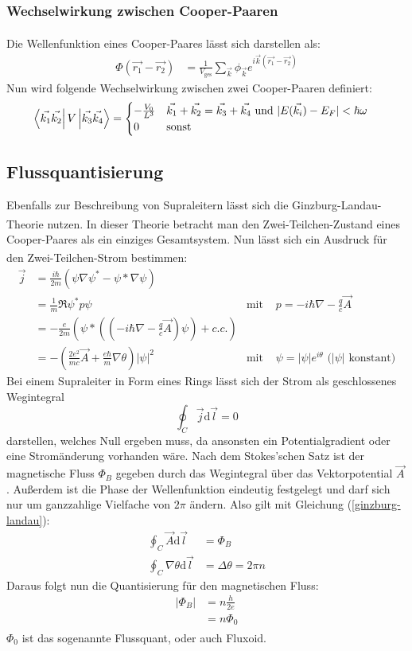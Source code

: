 \documentclass[12pt]{article}
\begin{document}
\subsubsection{Wechselwirkung zwischen Cooper-Paaren}
Die Wellenfunktion eines Cooper-Paares lässt sich darstellen als: \textsuperscript{\cite{anleitung}}
\begin{align}
	\Phi(\vec{r_1}-\vec{r_2})&=\frac1{V_{\mathrm{ges}}}\sum_{\vec k}\phi_{\vec k}e^{i\vec k(\vec{r_1}-\vec{r_2})}
\end{align}
Nun wird folgende Wechselwirkung zwischen zwei Cooper-Paaren definiert:
\begin{align}
	\bra{\vec{k_1}\vec{k_2}}V\ket{\vec{k_3}\vec{k_4}}&=\begin{cases}-\frac{V_0}{L^3}&\vec{k_1}+\vec{k_2}=\vec{k_3}+\vec{k_4} \text{ und }|E(\vec{k_i})-E_F|<\hbar\omega\\0&\text{sonst}\end{cases}
\end{align}

\subsection{Flussquantisierung}
Ebenfalls zur Beschreibung von Supraleitern lässt sich die Ginzburg-Landau-Theorie\textsuperscript{\cite{anleitung}} nutzen. In dieser Theorie betracht man den Zwei-Teilchen-Zustand eines Cooper-Paares als ein einziges Gesamtsystem. Nun lässt sich ein Ausdruck für den Zwei-Teilchen-Strom bestimmen\textsuperscript{\cite{anleitung}}:
\begin{align}
	\vec j&=\frac{i\hbar}{2m}\left(\psi\nabla\psi^* -\psi*\nabla\psi\right)\\
	&=\frac1m\Re{\psi^*p\psi}&\text{mit }&p=-i\hbar\nabla-\frac qc\vec A\\
	&=-\frac{e}{2m}\left(\psi*\left(\left(-i\hbar\nabla-\frac qc\vec A\right)\psi\right)+c.c.\right)\\
	&=-\left(\frac{2e^2}{mc}\vec A+\frac{e\hbar}{m}\nabla\theta\right)|\psi|^2&\text{mit }&\psi=|\psi|e^{i\theta}\text{ (}|\psi|\text{ konstant)}\label{ginzburg-landau}
\end{align}
Bei einem Supraleiter in Form eines Rings lässt sich der Strom als geschlossenes Wegintegral $$\oint_C\vec j\mathrm d\vec l=0$$ darstellen, welches Null ergeben muss, da ansonsten ein Potentialgradient oder eine Stromänderung vorhanden wäre. Nach dem Stokes'schen Satz ist der magnetische Fluss $\Phi_B$ gegeben durch das Wegintegral über das Vektorpotential $\vec{A}$. Außerdem ist die Phase der Wellenfunktion eindeutig festgelegt und darf sich nur um ganzzahlige Vielfache von $2\pi$ ändern. Also gilt mit Gleichung (\ref{ginzburg-landau}):
\begin{align*}
	\oint_C\vec A\mathrm d\vec l&=\Phi_B\\
	\oint_C\nabla\theta\mathrm d\vec l&=\Delta\theta=2\pi n
\end{align*}
Daraus folgt nun die Quantisierung für den magnetischen Fluss:
\begin{align*}
	|\Phi_B|&=n\frac h{2e}\\
	&=n\Phi_0
\end{align*}
$\Phi_0$ ist das sogenannte Flussquant, oder auch Fluxoid\textsuperscript{\cite{anleitung}}.
\end{document}
